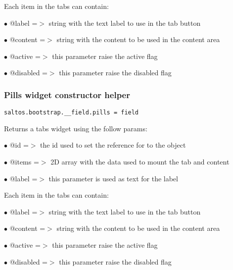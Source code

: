 \documentclass[a4paper]{article}
\begin{document}
Each item in the tabs can contain:

\begin{compactitem}
\item[\color{myblue}$\bullet$] @label    =$>$ string with the text label to use in the tab button
\item[\color{myblue}$\bullet$] @content  =$>$ string with the content to be used in the content area
\item[\color{myblue}$\bullet$] @active   =$>$ this parameter raise the active flag
\item[\color{myblue}$\bullet$] @disabled =$>$ this parameter raise the disabled flag
\end{compactitem}

\hypertarget{toc646}{}
\subsubsection{Pills widget constructor helper}

\begin{lstlisting}
saltos.bootstrap.__field.pills = field
\end{lstlisting}

Returns a tabs widget using the follow params:

\begin{compactitem}
\item[\color{myblue}$\bullet$] @id    =$>$ the id used to set the reference for to the object
\item[\color{myblue}$\bullet$] @items =$>$ 2D array with the data used to mount the tab and content
\item[\color{myblue}$\bullet$] @label    =$>$ this parameter is used as text for the label
\end{compactitem}

Each item in the tabs can contain:

\begin{compactitem}
\item[\color{myblue}$\bullet$] @label    =$>$ string with the text label to use in the tab button
\item[\color{myblue}$\bullet$] @content  =$>$ string with the content to be used in the content area
\item[\color{myblue}$\bullet$] @active   =$>$ this parameter raise the active flag
\item[\color{myblue}$\bullet$] @disabled =$>$ this parameter raise the disabled flag
\end{compactitem}
\end{document}
